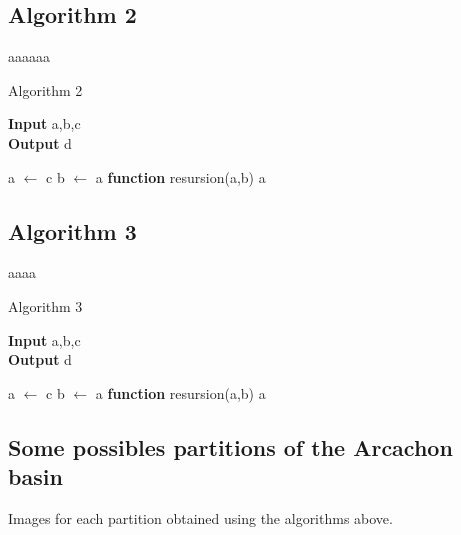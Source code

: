 \subsection{Algorithm 2}
aaaaaa
\begin{algorithm}[H]
    \caption*{Algorithm 2}
    \hspace*{\algorithmicindent} \textbf{Input} a,b,c\\
    \hspace*{\algorithmicindent} \textbf{Output} d
    \begin{algorithmic}
    \STATE a $\leftarrow$ c
    \STATE b $\leftarrow$ a
    \STATE \textbf{function} \quad resursion(a,b)
        \bindent
        \RETURN a
        \eindent
    \end{algorithmic}
    \end{algorithm}


\subsection{Algorithm 3}
aaaa
\begin{algorithm}[H]
    \caption*{Algorithm 3}
    \hspace*{\algorithmicindent} \textbf{Input} a,b,c\\
    \hspace*{\algorithmicindent} \textbf{Output} d
    \begin{algorithmic}
    \STATE a $\leftarrow$ c
    \STATE b $\leftarrow$ a
    \STATE \textbf{function} \quad resursion(a,b)
        \bindent
        \RETURN a
        \eindent
    \end{algorithmic}
    \end{algorithm}


\subsection{Some possibles partitions of the Arcachon basin}
Images for each partition obtained using the algorithms above.


